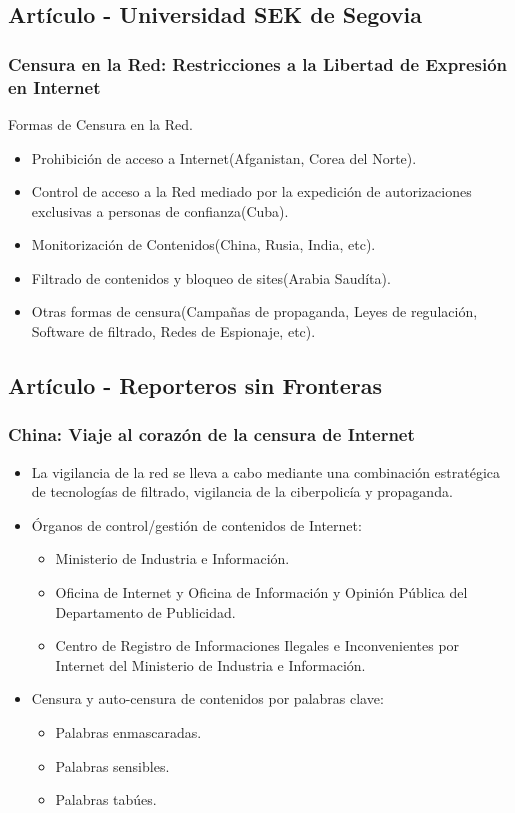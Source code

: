 \documentclass{beamer}
\begin{document}
\subsection{Art\'iculo - Universidad SEK de Segovia}
\frame
{
\transdissolve[duration=0.2]
\frametitle{Censura en la Red: Restricciones a la Libertad de Expresi\'on en Internet}
Formas de Censura en la Red.
\begin{itemize}
\item Prohibici\'on de acceso a Internet(Afganistan, Corea del Norte).
\item Control de acceso a la Red mediado por la expedici\'on de autorizaciones exclusivas a personas de confianza(Cuba).
\item Monitorizaci\'on de Contenidos(China, Rusia, India, etc).
\item Filtrado de contenidos y bloqueo de sites(Arabia Saud\'ita).
\item Otras formas de censura(Campa\~nas de propaganda, Leyes de regulaci\'on, Software de filtrado, Redes de Espionaje, etc).
\end{itemize}
}

\subsection{Art\'iculo - Reporteros sin Fronteras}
\frame
{
\transdissolve[duration=0.2]
\frametitle{China: Viaje al coraz\'on de la censura de Internet}
\begin{itemize}
	\item La vigilancia de la red se lleva a cabo mediante una combinaci\'on estrat\'egica de tecnolog\'ias de filtrado, vigilancia de la ciberpolic\'ia y propaganda.
	\item \'Organos de control/gesti\'on de contenidos de Internet:
	\begin{itemize}
		\item Ministerio de Industria e Informaci\'on.
		\item Oficina de Internet y Oficina de Informaci\'on y Opini\'on P\'ublica del Departamento de Publicidad.
		\item Centro de Registro de Informaciones Ilegales e Inconvenientes por Internet del Ministerio de Industria e Informaci\'on.
	\end{itemize}
	\item Censura y auto-censura de contenidos por palabras clave:
	\begin{itemize}
		\item Palabras enmascaradas.
		\item Palabras sensibles.
		\item Palabras tab\'ues.
	\end{itemize}
\end{itemize}
}
\end{document}
